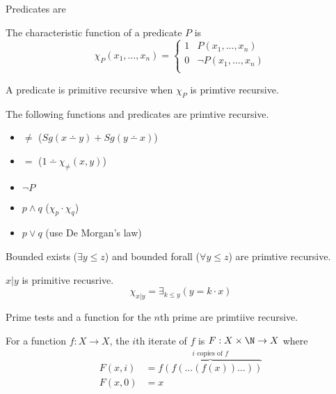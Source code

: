 \documentclass{article}
\begin{document}
\begin{theorem}
    Predicates are 
\end{theorem}
\begin{definition}
    The characteristic function of a predicate \(P\)
    is 
    \[\chi_P(x_1,\ldots,x_n) = \begin{cases}
        1 & P(x_1,\ldots,x_n) \\
        0 & \lnot P(x_1,\ldots,x_n) \\
    \end{cases}\]
\end{definition}
\begin{theorem}
    A predicate is primitive recursive when \(\chi_P\)
    is primtive recursive.
\end{theorem}
\begin{theorem}
    The following functions and predicates
    are primtive recursive.
    \begin{itemize}
        \item \(\ne\) (\(Sg(x\dotminus y)+Sg(y\dotminus x)\))
        \item \(=\) (\(1\dotminus \chi_\ne(x,y) \))
        \item \(\lnot P\)
        \item \(p \land q\) (\(\chi_p \cdot\chi_q\))
        \item \(p \lor q\) (use De Morgan's law)
    \end{itemize}
\end{theorem}
\begin{theorem}
    Bounded exists (\(\exists y\le z\)) and
    bounded forall (\(\forall y\le z\))  are primtive recursive.
\end{theorem}
\begin{theorem}
    \(x|y\) is primitive recusrive.
    \[
    \chi_{x|y}=\exists_{k\le y} (y=k\cdot x)  
    \]
\end{theorem}
\begin{theorem}
    Prime tests and a function for the \(n\)th prime
    are primtiive recursive.
\end{theorem}
\begin{definition}[Iteration]
    For a function \(f:X\to X\),
    the \(i\)th iterate of \(f\)
    is \(F:X\times \N \to X\) where
    \begin{align*}
        F(x, i) &= \overbrace{f(f(\ldots(f(x))\ldots))}^{i \text{ copies of } f} \\
        F(x, 0) &= x
    \end{align*}
\end{definition}
\end{document}

